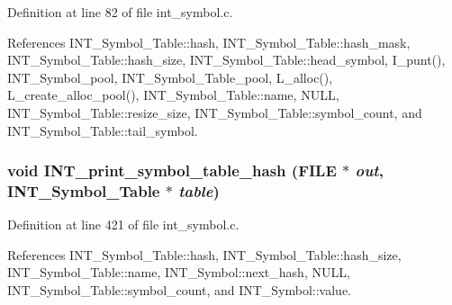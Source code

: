 Definition at line 82 of file int\_\-symbol.c.

References INT\_\-Symbol\_\-Table::hash, INT\_\-Symbol\_\-Table::hash\_\-mask, INT\_\-Symbol\_\-Table::hash\_\-size, INT\_\-Symbol\_\-Table::head\_\-symbol, I\_\-punt(), INT\_\-Symbol\_\-pool, INT\_\-Symbol\_\-Table\_\-pool, L\_\-alloc(), L\_\-create\_\-alloc\_\-pool(), INT\_\-Symbol\_\-Table::name, NULL, INT\_\-Symbol\_\-Table::resize\_\-size, INT\_\-Symbol\_\-Table::symbol\_\-count, and INT\_\-Symbol\_\-Table::tail\_\-symbol.
\subsubsection{\setlength{\rightskip}{0pt plus 5cm}void INT\_\-print\_\-symbol\_\-table\_\-hash (FILE $\ast$ {\em out}, \bf{INT\_\-Symbol\_\-Table} $\ast$ {\em table})}\label{int__symbol_8h_b3a43802ef643a29ed29c1ed5abbeaa7}




Definition at line 421 of file int\_\-symbol.c.

References INT\_\-Symbol\_\-Table::hash, INT\_\-Symbol\_\-Table::hash\_\-size, INT\_\-Symbol\_\-Table::name, INT\_\-Symbol::next\_\-hash, NULL, INT\_\-Symbol\_\-Table::symbol\_\-count, and INT\_\-Symbol::value.
